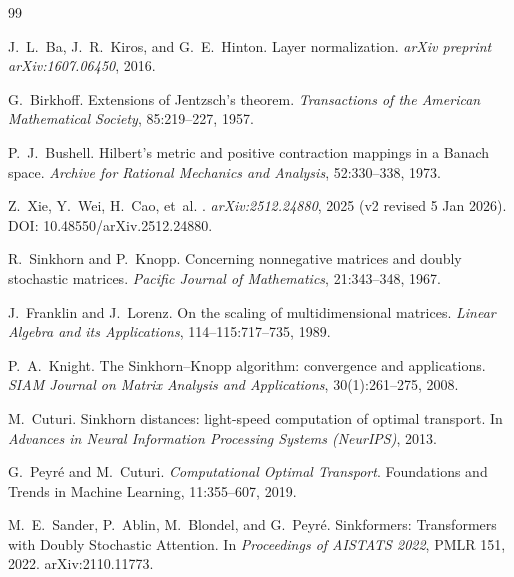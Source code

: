 \documentclass[11pt]{article}
\numberwithin{equation}{section}
\theoremstyle{plain}
\theoremstyle{definition}
\theoremstyle{remark}
\begin{document}
\begin{thebibliography}{99}

J.~L.~Ba, J.~R.~Kiros, and G.~E.~Hinton.
\newblock Layer normalization.
\newblock \emph{arXiv preprint arXiv:1607.06450}, 2016.

G.~Birkhoff.
\newblock Extensions of Jentzsch's theorem.
\newblock \emph{Transactions of the American Mathematical Society}, 85:219--227, 1957.

P.~J.~Bushell.
\newblock Hilbert's metric and positive contraction mappings in a Banach space.
\newblock \emph{Archive for Rational Mechanics and Analysis}, 52:330--338, 1973.

Z.~Xie, Y.~Wei, H.~Cao, et~al.
.
\newblock \emph{arXiv:2512.24880}, 2025 (v2 revised 5 Jan 2026).
\newblock DOI: 10.48550/arXiv.2512.24880.


R.~Sinkhorn and P.~Knopp.
\newblock Concerning nonnegative matrices and doubly stochastic matrices.
\newblock \emph{Pacific Journal of Mathematics}, 21:343--348, 1967.

J.~Franklin and J.~Lorenz.
\newblock On the scaling of multidimensional matrices.
\newblock \emph{Linear Algebra and its Applications}, 114--115:717--735, 1989.

P.~A.~Knight.
\newblock The Sinkhorn--Knopp algorithm: convergence and applications.
\newblock \emph{SIAM Journal on Matrix Analysis and Applications}, 30(1):261--275, 2008.

 


M.~Cuturi.
\newblock Sinkhorn distances: light-speed computation of optimal transport.
\newblock In \emph{Advances in Neural Information Processing Systems (NeurIPS)}, 2013.

G.~Peyr\'e and M.~Cuturi.
\newblock \emph{Computational Optimal Transport}.
\newblock Foundations and Trends in Machine Learning, 11:355--607, 2019.

M.~E.~Sander, P.~Ablin, M.~Blondel, and G.~Peyr\'e.
\newblock Sinkformers: Transformers with Doubly Stochastic Attention.
\newblock In \emph{Proceedings of AISTATS 2022}, PMLR 151, 2022.
\newblock arXiv:2110.11773.


\end{thebibliography}
\end{document}
